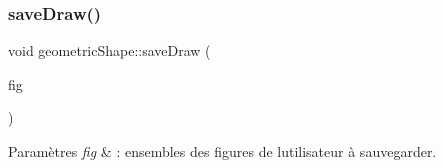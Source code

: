 \subsubsection{\texorpdfstring{save\+Draw()}{saveDraw()}}
{\footnotesize\ttfamily void geometric\+Shape\+::save\+Draw (\begin{DoxyParamCaption}\item[{const std\+::vector$<$ std\+::shared\+\_\+ptr$<$ \hyperlink{classgeometric_shape_1_1_shape}{geometric\+Shape\+::\+Shape} $>$$>$ \&}]{fig }\end{DoxyParamCaption})}


\begin{DoxyParams}{Paramètres}
{\em fig} & \+: ensembles des figures de l\textquotesingle{}utilisateur à sauvegarder. \\
\hline
\end{DoxyParams}
